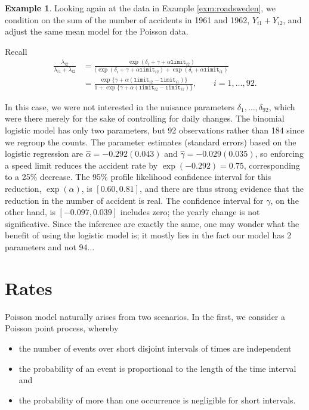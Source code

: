 \documentclass[
  11pt,
  letterpaper,
]{book}
\providecommand{\tightlist}{%
  \setlength{\itemsep}{0pt}\setlength{\parskip}{0pt}}
\theoremstyle{definition}
\theoremstyle{definition}
\newtheorem{example}{Example}[chapter]
\theoremstyle{definition}
\theoremstyle{definition}
\theoremstyle{remark}
\begin{document}
\begin{example}
\protect\hypertarget{exm:swedenex2}{}{\label{exm:swedenex2} }
Looking again at the data in Example \ref{exm:roadsweden}, we condition on the sum of the number of accidents in 1961 and 1962, \(Y_{i1} + Y_{i2}\), and adjust the same mean model for the Poisson data.
\end{example}
Recall
\begin{align*}
\frac{\lambda_{i2}}{
\lambda_{i1} + \lambda_{i2}} &= \frac{\exp(\delta_i + \gamma + \alpha \texttt{limit}_{i2})}{(\exp(\delta_i + \gamma + \alpha \texttt{limit}_{i2}) + \exp(\delta_i + \alpha \texttt{limit}_{i1})} \\&= \frac{\exp\{\gamma + \alpha(\texttt{limit}_{i2}-\texttt{limit}_{i1})\}}{1+{\exp\{\gamma + \alpha(\texttt{limit}_{i2}-\texttt{limit}_{i1})\}}}, \qquad i=1, \ldots, 92. 
\end{align*}

In this case, we were not interested in the nuisance parameters \(\delta_1, \ldots, \delta_{92}\), which were there merely for the sake of controlling for daily changes. The binomial logistic model has only two parameters, but 92 observations rather than 184 since we regroup the counts.
The parameter estimates (standard errors) based on the logistic regression are \(\widehat{\alpha} = -0.292 (0.043)\) and \(\widehat{\gamma}=-0.029(0.035)\), so enforcing a speed limit reduces the accident rate by \(\exp(-0.292)=0.75\), corresponding to a 25\% decrease. The 95\% profile likelihood confidence interval for this reduction, \(\exp(\alpha)\), is \([0.60, 0.81]\), and there are thus strong evidence that the reduction in the number of accident is real. The confidence interval for \(\gamma\), on the other hand, is \([-0.097, 0.039]\) includes zero; the yearly change is not significative. Since the inference are exactly the same, one may wonder what the benefit of using the logistic model is; it mostly lies in the fact our model has 2 parameters and not 94\(\ldots\)

\hypertarget{rates}{%
\section{Rates}\label{rates}}

Poisson model naturally arises from two scenarios. In the first, we consider a Poisson point process, whereby

\begin{itemize}
\tightlist
\item
  the number of events over short disjoint intervals of times are independent
\item
  the probability of an event is proportional to the length of the time interval and
\item
  the probability of more than one occurrence is negligible for short intervals.
\end{itemize}
\end{document}
